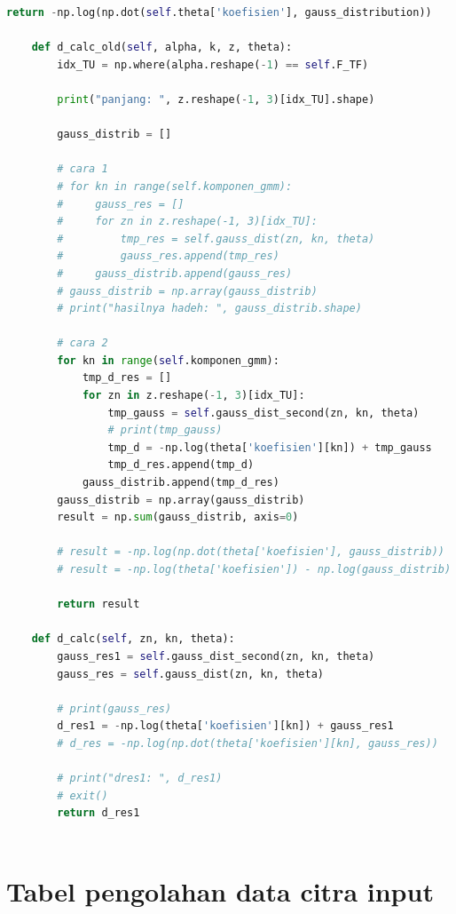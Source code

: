 \begin{lstlisting}[language=Python, basicstyle=\tiny]
		return -np.log(np.dot(self.theta['koefisien'], gauss_distribution))

	def d_calc_old(self, alpha, k, z, theta):
		idx_TU = np.where(alpha.reshape(-1) == self.F_TF)

		print("panjang: ", z.reshape(-1, 3)[idx_TU].shape)

		gauss_distrib = []

		# cara 1
		# for kn in range(self.komponen_gmm):
		#     gauss_res = []
		#     for zn in z.reshape(-1, 3)[idx_TU]:
		#         tmp_res = self.gauss_dist(zn, kn, theta)
		#         gauss_res.append(tmp_res)
		#     gauss_distrib.append(gauss_res)
		# gauss_distrib = np.array(gauss_distrib)
		# print("hasilnya hadeh: ", gauss_distrib.shape)
		
		# cara 2
		for kn in range(self.komponen_gmm):
			tmp_d_res = []
			for zn in z.reshape(-1, 3)[idx_TU]:
				tmp_gauss = self.gauss_dist_second(zn, kn, theta)
				# print(tmp_gauss)
				tmp_d = -np.log(theta['koefisien'][kn]) + tmp_gauss
				tmp_d_res.append(tmp_d)
			gauss_distrib.append(tmp_d_res)
		gauss_distrib = np.array(gauss_distrib)
		result = np.sum(gauss_distrib, axis=0)

		# result = -np.log(np.dot(theta['koefisien'], gauss_distrib))
		# result = -np.log(theta['koefisien']) - np.log(gauss_distrib)

		return result
		
	def d_calc(self, zn, kn, theta):
		gauss_res1 = self.gauss_dist_second(zn, kn, theta)
		gauss_res = self.gauss_dist(zn, kn, theta)

		# print(gauss_res)
		d_res1 = -np.log(theta['koefisien'][kn]) + gauss_res1
		# d_res = -np.log(np.dot(theta['koefisien'][kn], gauss_res))

		# print("dres1: ", d_res1)
		# exit()
		return d_res1
	
\end{lstlisting}

\chapter{Tabel pengolahan data citra input}

